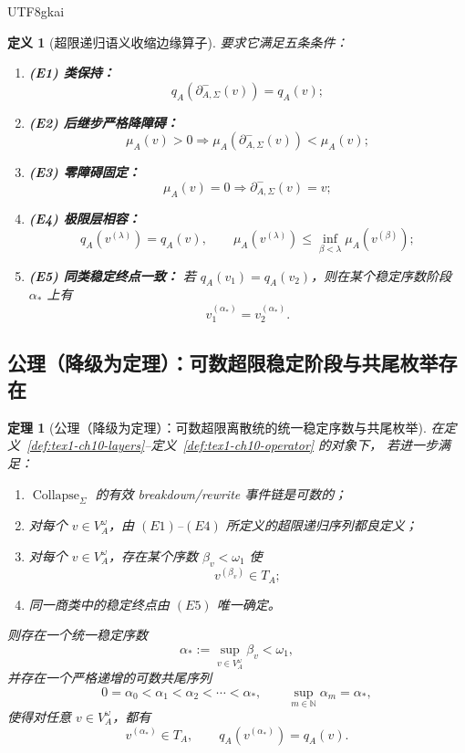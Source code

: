 \documentclass[12pt]{article}
\newtheorem{definition}{定义}[section]
\newtheorem{theorem}{定理}[section]
\newcommand{\NN}{\mathbb{N}}
\newcommand{\Collapse}{\operatorname{Collapse}}
\begin{document}
\begin{CJK*}{UTF8}{gkai}
\begin{definition}[超限递归语义收缩边缘算子]
要求它满足五条条件：
\begin{enumerate}
  \item \textbf{(E1) 类保持：}
  \[
    q_A(\partial^-_{A,\Sigma}(v))=q_A(v);
  \]
  \item \textbf{(E2) 后继步严格降障碍：}
  \[
    \mu_A(v)>0
    \Rightarrow
    \mu_A(\partial^-_{A,\Sigma}(v))<\mu_A(v);
  \]
  \item \textbf{(E3) 零障碍固定：}
  \[
    \mu_A(v)=0
    \Rightarrow
    \partial^-_{A,\Sigma}(v)=v;
  \]
  \item \textbf{(E4) 极限层相容：}
  \[
    q_A(v^{(\lambda)})=q_A(v),
    \qquad
    \mu_A(v^{(\lambda)})\le \inf_{\beta<\lambda}\mu_A(v^{(\beta)});
  \]
  \item \textbf{(E5) 同类稳定终点一致：}
  若 \(q_A(v_1)=q_A(v_2)\)，则在某个稳定序数阶段 \(\alpha_\ast\) 上有
  \[
    v_1^{(\alpha_\ast)}=v_2^{(\alpha_\ast)}.
  \]
\end{enumerate}
\end{definition}

\subsection{公理（降级为定理）：可数超限稳定阶段与共尾枚举存在}
\label{subsec:tex1-ch10-axiom}

\begin{theorem}[公理（降级为定理）：可数超限离散统的统一稳定序数与共尾枚举]
\label{thm:tex1-ch10-axiom-downgraded}
在定义~\ref{def:tex1-ch10-layers}--定义~\ref{def:tex1-ch10-operator} 的对象下，
若进一步满足：
\begin{enumerate}
  \item \(\Collapse_{\Sigma}\) 的有效 breakdown/rewrite 事件链是可数的；
  \item 对每个 \(v\in V_A^\omega\)，由 \((E1)\)--\((E4)\) 所定义的超限递归序列都良定义；
  \item 对每个 \(v\in V_A^\omega\)，存在某个序数 \(\beta_v<\omega_1\) 使
  \[
    v^{(\beta_v)}\in T_A;
  \]
  \item 同一商类中的稳定终点由 \((E5)\) 唯一确定。
\end{enumerate}
则存在一个统一稳定序数
\[
  \alpha_\ast:=\sup_{v\in V_A^\omega}\beta_v<\omega_1,
\]
并存在一个严格递增的可数共尾序列
\[
  0=\alpha_0<\alpha_1<\alpha_2<\cdots<\alpha_\ast,
  \qquad
  \sup_{m\in\NN}\alpha_m=\alpha_\ast,
\]
使得对任意 \(v\in V_A^\omega\)，都有
\[
  v^{(\alpha_\ast)}\in T_A,
  \qquad
  q_A(v^{(\alpha_\ast)})=q_A(v).
\]
\end{theorem}


\end{CJK*}
\end{document}
